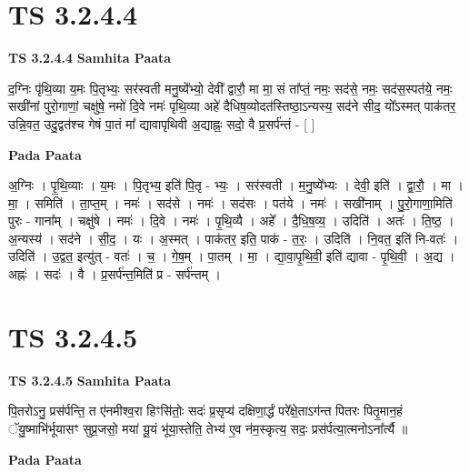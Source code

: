 \documentclass[17pt]{extarticle}
\begin{document}
\section{ TS 3.2.4.4 }

\textbf{TS 3.2.4.4 } \newline
\textbf{Samhita Paata} \newline

द॒ग्निः पृ॑थि॒व्या य॒मः पि॒तृभ्यः॒ सर॑स्वती मनु॒ष्ये᳚भ्यो॒ देवी᳚ द्वारौ॒ मा मा॒ सं ता᳚प्तं॒ नमः॒ सद॑से॒ नमः॒ सद॑स॒स्पत॑ये॒ नमः॒ सखी॑नां पुरो॒गाणां॒ चक्षु॑षे॒ नमो॑ दि॒वे नमः॑ पृथि॒व्या अहे॑ दैधिष॒व्योदत॑स्तिष्ठा॒ऽन्यस्य॒ सद॑ने सीद॒ यो᳚ऽस्मत् पाक॑तर॒ उन्नि॒वत॒ उदु॒द्वत॑श्च गेषं पा॒तं मा᳚ द्यावापृथिवी अ॒द्याह्नः॒ सदो॒ वै प्र॒सर्प॑न्तं - [  ] \newline

\textbf{Pada Paata} \newline

अ॒ग्निः । पृ॒थि॒व्याः । य॒मः । पि॒तृभ्य॒ इति॑ पि॒तृ - भ्यः॒ । सर॑स्वती । म॒नु॒ष्ये᳚भ्यः । देवी॒ इति॑ । द्वा॒रौ॒ । मा । मा॒ । समिति॑ । ता॒प्त॒म् । नमः॑ । सद॑से । नमः॑ । सद॑सः । पत॑ये । नमः॑ । सखी॑नाम् । पु॒रो॒गाणा॒मिति॑ पुरः - गाना᳚म् । चक्षु॑षे । नमः॑ । दि॒वे । नमः॑ । पृ॒थि॒व्यै । अहे᳚ । दै॒धि॒ष॒व्य॒ । उदिति॑ । अतः॑ । ति॒ष्ठ॒ । अ॒न्यस्य॑ । सद॑ने । सी॒द॒ । यः । अ॒स्मत् । पाक॑तर॒ इति॒ पाक॑ - त॒रः॒ । उदिति॑ । नि॒वत॒ इति॑ नि-वतः॑ । उदिति॑ । उ॒द्वत॒ इत्यु॑त् - वतः॑ । च॒ । गे॒ष॒म् । पा॒तम् । मा॒ । द्या॒वा॒पृ॒थि॒वी॒ इति॑ द्यावा - पृ॒थि॒वी॒ । अ॒द्य । अह्नः॑ । सदः॑ । वै । प्र॒सर्प॑न्त॒मिति॑ प्र - सर्प॑न्तम् ।  \newline





\section{ TS 3.2.4.5 }

\textbf{TS 3.2.4.5 } \newline
\textbf{Samhita Paata} \newline

पि॒तरोऽनु॒ प्रस॑र्पन्ति॒ त ए॑नमीश्व॒रा हिꣳसि॑तोः॒ सदः॑ प्र॒सृप्य॑ दक्षिणा॒र्द्धं परे᳚क्षे॒ताऽग॑न्त पितरः पितृ॒मान॒हं ॅयु॒ष्माभि॑र्भूयासꣳ सुप्र॒जसो॒ मया॑ यू॒यं भू॑या॒स्तेति॒ तेभ्य॑ ए॒व न॑म॒स्कृत्य॒ सदः॒ प्रस॑र्पत्या॒त्मनोऽना᳚र्त्यै ॥ \newline

\textbf{Pada Paata} \newline
\end{document}
